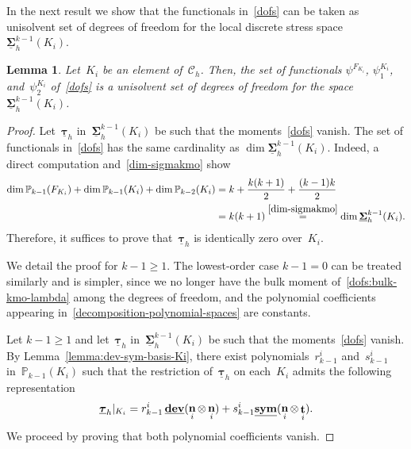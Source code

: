 \documentclass[a4paper,twoside,10pt]{article}
\theoremstyle{plain}
\newtheorem{lemma}[theorem]{Lemma}
\theoremstyle{remark}
\theoremstyle{definition}
\numberwithin{equation}{section}
\numberwithin{figure}{section}
\newcommand{\Pbbkmo}{\mathbb{P}_{k-1}}
\newcommand{\Pbbkmt}{\mathbb{P}_{k-2}}
\newcommand{\Ccalh}{\mathcal{C}_h}
\newcommand{\K}{K}
\newcommand{\F}{F}
\newcommand{\Sigmah}{\underline{\boldsymbol{\Sigma}}_h}
\newcommand{\Sigmahkmo}{\Sigmah^{k-1}}
\newcommand{\taubfh}{\underline{\boldsymbol{\tau}}_h}
\DeclareMathOperator{\dev}{\underline{\mathbf{dev}}}
\newcommand{\sym}{\underline{\bf{sym}}}
\DeclareMathOperator{\norm}{\bf{n}}
\DeclareMathOperator{\tang}{\bf{t}}
\newcommand{\psiEi}{\psi^{\Fi}}
\newcommand{\psiKio}{\psi^{\Ki}_1}
\newcommand{\psiKit}{\psi^{\Ki}_2}
\newcommand{\rkmoi}{r_{k-1}^i}
\newcommand{\skmoi}{s_{k-1}^i}
\newcommand{\Ki}{{\K_i}}
\newcommand{\Fi}{{\F_{\Ki}}}
\newcommand{\normi}{\norm_i}
\newcommand{\tangi}{\tang_i}
\begin{document}
In the next result we show that the functionals in~\eqref{dofs}
can be taken as unisolvent set of degrees of freedom for
the local discrete stress space~$\Sigmahkmo(\Ki)$.
\begin{lemma} \label{lemma:unisolvence}
Let~$\Ki$ be an element of~$\Ccalh$.
Then,
the set of functionals $\psiEi$, $\psiKio$, and~$\psiKit$ of~\eqref{dofs}
is a unisolvent set of degrees of freedom for the space~$\Sigmahkmo(\Ki)$.
\end{lemma}
\begin{proof}
Let~$\taubfh$ in~$\Sigmahkmo(\Ki)$
be such that the moments~\eqref{dofs} vanish.
The set of functionals in~\eqref{dofs}
has the same cardinality as $\dim \Sigmahkmo(\Ki)$.
Indeed,
a direct computation
and~\eqref{dim-sigmakmo}
show
\begin{equation} \label{dimensions-check}
\begin{split}
\dim \Pbbkmo(\Fi) + \dim \Pbbkmo(\Ki) + \dim \Pbbkmt(\Ki)
&= k + \frac{k(k+1)}{2} + \frac{(k-1)k}{2} \\
&= k(k+1)
\overset{\eqref{dim-sigmakmo}}{=} \dim \Sigmahkmo(\Ki).
\end{split}
\end{equation}
Therefore,
it suffices to prove that~$\taubfh$ is identically zero over~$\Ki$.

We detail the proof for $k-1 \geq 1$.
The lowest-order case $k-1 = 0$ can be treated similarly
and is simpler,
since we no longer have the bulk moment of~\eqref{dofs:bulk-kmo-lambda}
among the degrees of freedom,
and the polynomial coefficients appearing in~\eqref{decomposition-polynomial-spaces} are constants.

Let $k-1 \geq 1$
and let~$\taubfh$ in~$\Sigmahkmo(\Ki)$ be such that
the moments~\eqref{dofs} vanish.
By Lemma~\ref{lemma:dev-sym-basis-Ki},
there exist polynomials~$\rkmoi$ and~$\skmoi$ in~$\Pbbkmo(\Ki)$
such that the restriction of~$\taubfh$ on each~$\Ki$
admits the following representation
\begin{equation} \label{decomposition-taubfh}
\taubfh{}|_{\Ki} = \rkmoi\dev(\normi\otimes\normi) + \skmoi\sym(\normi\otimes\tangi).
\end{equation}
We proceed by proving that both polynomial coefficients vanish.


\end{proof}
\end{document}
